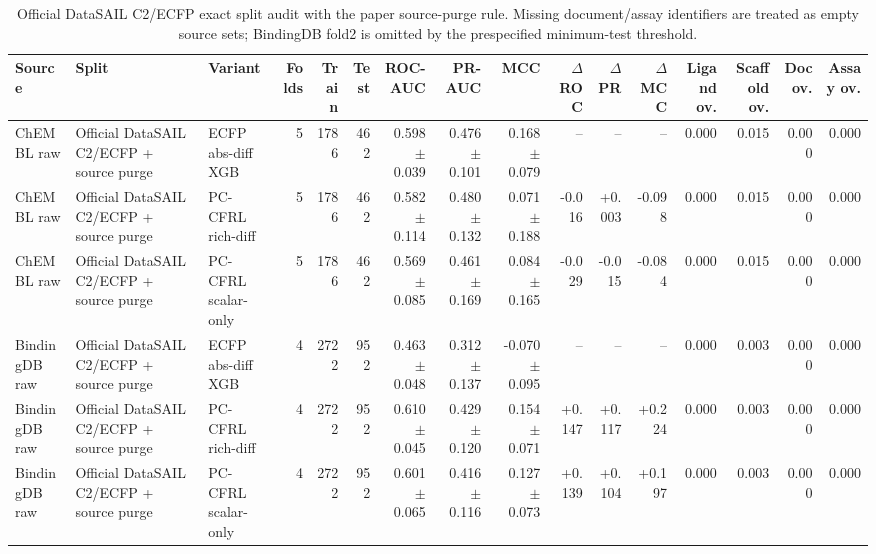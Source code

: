 \begin{table}[!t]
\centering
\scriptsize
\caption{Official DataSAIL C2/ECFP exact split audit with the paper source-purge rule. Missing document/assay identifiers are treated as empty source sets; BindingDB fold2 is omitted by the prespecified minimum-test threshold.}
\label{tab:supp_official_datasail}
\begin{tabular}{lllrrrrrrrrrrrrr}
\toprule
Source & Split & Variant & Folds & Train & Test & ROC-AUC & PR-AUC & MCC & $\Delta$ ROC & $\Delta$ PR & $\Delta$ MCC & Ligand ov. & Scaffold ov. & Doc ov. & Assay ov. \\
\midrule
ChEMBL raw & Official DataSAIL C2/ECFP + source purge & ECFP abs-diff XGB & 5 & 1786 & 462 & 0.598 $\pm$ 0.039 & 0.476 $\pm$ 0.101 & 0.168 $\pm$ 0.079 & -- & -- & -- & 0.000 & 0.015 & 0.000 & 0.000 \\
ChEMBL raw & Official DataSAIL C2/ECFP + source purge & PC-CFRL rich-diff & 5 & 1786 & 462 & 0.582 $\pm$ 0.114 & 0.480 $\pm$ 0.132 & 0.071 $\pm$ 0.188 & -0.016 & +0.003 & -0.098 & 0.000 & 0.015 & 0.000 & 0.000 \\
ChEMBL raw & Official DataSAIL C2/ECFP + source purge & PC-CFRL scalar-only & 5 & 1786 & 462 & 0.569 $\pm$ 0.085 & 0.461 $\pm$ 0.169 & 0.084 $\pm$ 0.165 & -0.029 & -0.015 & -0.084 & 0.000 & 0.015 & 0.000 & 0.000 \\
BindingDB raw & Official DataSAIL C2/ECFP + source purge & ECFP abs-diff XGB & 4 & 2722 & 952 & 0.463 $\pm$ 0.048 & 0.312 $\pm$ 0.137 & -0.070 $\pm$ 0.095 & -- & -- & -- & 0.000 & 0.003 & 0.000 & 0.000 \\
BindingDB raw & Official DataSAIL C2/ECFP + source purge & PC-CFRL rich-diff & 4 & 2722 & 952 & 0.610 $\pm$ 0.045 & 0.429 $\pm$ 0.120 & 0.154 $\pm$ 0.071 & +0.147 & +0.117 & +0.224 & 0.000 & 0.003 & 0.000 & 0.000 \\
BindingDB raw & Official DataSAIL C2/ECFP + source purge & PC-CFRL scalar-only & 4 & 2722 & 952 & 0.601 $\pm$ 0.065 & 0.416 $\pm$ 0.116 & 0.127 $\pm$ 0.073 & +0.139 & +0.104 & +0.197 & 0.000 & 0.003 & 0.000 & 0.000 \\
\bottomrule
\end{tabular}
\end{table}
